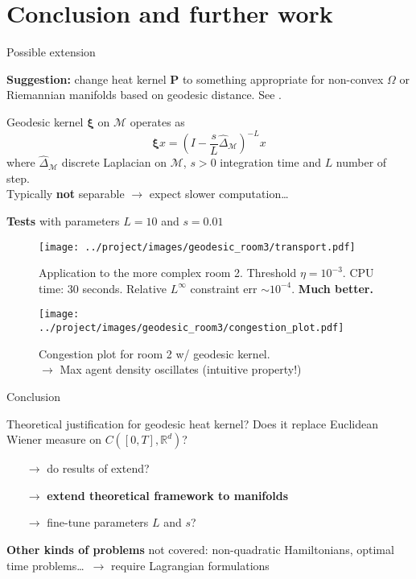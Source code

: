 \documentclass[xcolor={dvipsnames}]{beamer}
\newcommand{\RR}{\mathbb{R}}
\newcommand{\bfP}{\mathbf{P}}
\newcommand{\calM}{\mathcal{M}}
\newcommand{\redfont}{\color{darkred}}
\newcommand{\bluefont}{\color{RoyalBlue}}
\newcommand{\greenfont}{\color{Green!90!black}}
\begin{document}
\section{Conclusion and further work}


\begin{frame}{Possible extension}
	
	
	\textbf{Suggestion:} change heat kernel $\bfP$ to something appropriate for non-convex $\Omega$ or Riemannian manifolds based on geodesic distance. See \textcite{peyr2015entropic}.
	
	Geodesic kernel $\boldsymbol{\xi}$ on $\calM$ operates as
	\[
		\boldsymbol{\xi}x =
		\left(I - \frac{s}{L}\hat{\Delta}_\calM \right)^{-L}x
	\]
	where $\hat{\Delta}_\calM$ discrete Laplacian on $\calM$, $s>0$ integration time and $L$ number of step.\\
	Typically \textbf{not} separable $\rightarrow$ {\redfont expect slower computation}\ldots
	
	\textbf{Tests} with parameters $L=10$ and $s=0.01$
	
\end{frame}


\begin{frame}
	\begin{figure}
		\texttt{[image: ../project/images/geodesic\_room3/transport.pdf]}
		\caption{Application to the more complex room 2. Threshold $\eta = 10^{-3}$. CPU time: $30$ seconds. Relative $L^\infty$ constraint err $\sim 10^{-4}$. {\greenfont\bfseries Much better.}}
	\end{figure}
\end{frame}

\begin{frame}
	\begin{figure}
		\centering
		\texttt{[image: ../project/images/geodesic\_room3/congestion\_plot.pdf]}
		\caption{Congestion plot for room 2 w/ geodesic kernel.\\
		$\rightarrow$ Max agent density oscillates (intuitive property!)}
	\end{figure}
\end{frame}
	

\begin{frame}{Conclusion}
	
	Theoretical justification for geodesic heat kernel? Does it replace Euclidean Wiener measure on $C([0,T], \RR^d)$?
	\begin{itemize}
		\item[$\rightarrow$] do results of \textcite{benamou2018entropy} extend?
		\item[$\rightarrow$] \textbf{\bluefont extend theoretical framework to manifolds}
		\item[$\rightarrow$] fine-tune parameters $L$ and $s$?
	\end{itemize}
	\pause
	
	\textbf{Other kinds of problems} not covered: non-quadratic Hamiltonians, optimal time problems\ldots~$\rightarrow$ require Lagrangian formulations
	
\end{frame}



\begin{frame}[allowframebreaks]	
	\printbibliography{}
\end{frame}
\end{document}
